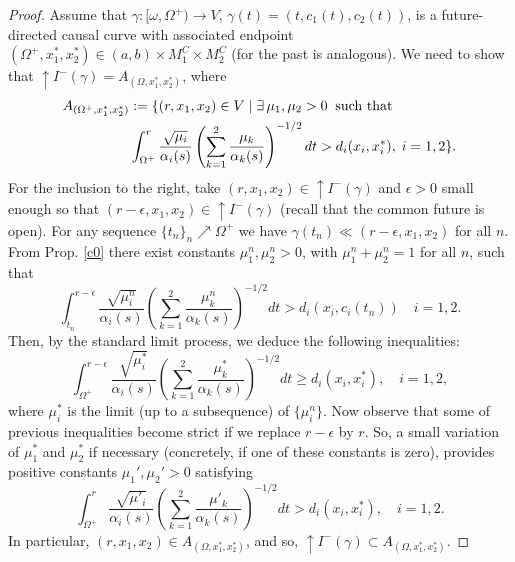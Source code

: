 \begin{proof} Assume that $\gamma:[\omega,\Omega^+) \rightarrow V$, $\gamma(t)=(t,c_1(t),c_2(t))$, is a future-directed causal curve with associated endpoint $(\Omega^+,x_1^*,x_2^*) \in (a,b) \times M_{1}^{C} \times M_{2}^{C}$ (for the past is analogous). We need to show that $\uparrow I^-(\gamma)=A_{(\Omega,x_1^*,x_2^*)}$, where
\begin{equation*}
\begin{aligned}
A_{(\Omega^+,x_1^{*},x_2^*)}&:=\{(r,x_1,x_2) \in V \mid \exists \,  \mu_{1},\mu_{2} > 0\;\; \hbox{{\rm such that}} \\
        &
        \int_{\Omega^+}^{r}\frac{\sqrt{\mu_{i}}}{\alpha_i(s)}\left(\sum_{k=1}^2\frac{\mu_k}{\alpha_k(s)}\right)^{-1/2}dt > d_{i}(x_{i},x_{i}^*),\; i=1,2\}.%
\end{aligned}
\end{equation*}
For the inclusion to the right, take $(r,x_1,x_2) \in \uparrow I^{-}(\gamma)$ and $\epsilon>0$ small enough so that $(r-\epsilon,x_1,x_2)\in \uparrow I^-(\gamma)$ (recall that the common future is open). For any sequence $\{t_{n}\}_{n}\nearrow \Omega^+$ we have $\gamma(t_n) \ll (r-\epsilon,x_1,x_2)$ for all $n$. From Prop. \ref{c0} there exist constants $\mu^n_{1},\mu^n_{2}>0$, with $\mu^n_{1}+\mu_{2}^n=1$ for all $n$, such that
\[
\int_{t_n}^{r-\epsilon}\frac{\sqrt{\mu^n_{i}}}{\alpha_i(s)}\left(\sum_{k=1}^2\frac{\mu_k^n}{\alpha_k(s)}\right)^{-1/2}dt > d_{i}(x_i,c_{i}(t_n))\quad i=1,2.
\]
Then, by the standard limit process, we deduce the following inequalities:
\[
\int_{\Omega^+}^{r-\epsilon}\frac{\sqrt{\mu^*_{i}}}{\alpha_i(s)}\left(\sum_{k=1}^2\frac{\mu_k^*}{\alpha_k(s)}\right)^{-1/2}dt \geq d_{i}(x_{i},x_{i}^{*}),\quad i=1,2,
\] where $\mu_i^*$ is the limit (up to a subsequence) of $\{\mu_i^n\}$. Now observe that some of previous inequalities become strict if we replace $r-\epsilon$ by $r$. So, a small variation of $\mu_1^*$ and $\mu_2^*$ if necessary (concretely, if one of these constants is zero), provides
positive constants $\mu_{1}',\mu_{2}'>0$ satisfying
\[
\int_{\Omega^+}^{r}\frac{\sqrt{\mu'_{i}}}{\alpha_i(s)}\left(\sum_{k=1}^2\frac{\mu'_k}{\alpha_k(s)}\right)^{-1/2}dt > d_{i}(x_{i},x_{i}^{*}),\quad i=1,2.
\]
In particular, $(r,x_1,x_2)\in A_{(\Omega,x_1^{*},x_2^*)}$, and so, $\uparrow I^{-}(\gamma) \subset A_{(\Omega,x_1^{*},x_2^*)}$.


\end{proof}
